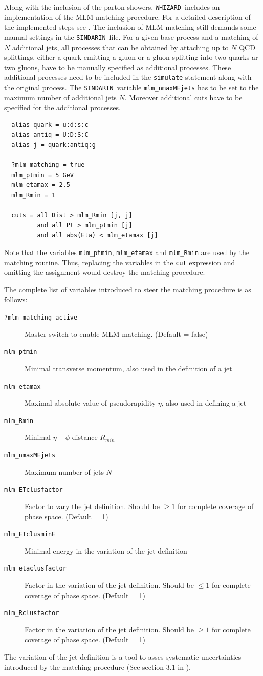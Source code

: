 \documentclass[12pt]{book}
\newcommand{\ttt}[1]{\texttt{#1}}
\newcommand{\whizard}{\ttt{WHIZARD}}
\newcommand{\sindarin}{\ttt{SINDARIN}}
\begin{document}
Along with the inclusion of the parton showers, \whizard\ includes an
implementation of the MLM matching procedure. For a detailed
description of the implemented steps see \cite{Kilian:2011ka}. The
inclusion of MLM matching still demands some manual settings in the
\sindarin\ file. For a given base process and a matching of $N$
additional jets, all processes that can be obtained by attaching up to
$N$ QCD splittings, either a quark emitting a gluon or a gluon
splitting into two quarks ar two gluons, have to be manually specified
as additional processes. These additional processes need to be
included in the \ttt{simulate} statement along with the original
process. The \sindarin\ variable \ttt{mlm\_nmaxMEjets} has to be
set to the maximum number of additional jets $N$. Moreover additional
cuts have to be specified for the additional processes.
\begin{verbatim}
  alias quark = u:d:s:c
  alias antiq = U:D:S:C
  alias j = quark:antiq:g

  ?mlm_matching = true
  mlm_ptmin = 5 GeV
  mlm_etamax = 2.5
  mlm_Rmin = 1

  cuts = all Dist > mlm_Rmin [j, j]
         and all Pt > mlm_ptmin [j]
         and all abs(Eta) < mlm_etamax [j]
\end{verbatim}
Note that the variables \ttt{mlm\_ptmin}, \ttt{mlm\_etamax} and
\ttt{mlm\_Rmin} are used by the matching routine. Thus, replacing the
variables in the \ttt{cut} expression and omitting the assignment
would destroy the matching procedure.

The complete list of variables introduced to steer the matching procedure is as follows:
\begin{description}
\item[\ttt{?mlm\_matching\_active}] Master switch to enable MLM
  matching. (Default = false)
\item[\ttt{mlm\_ptmin}] Minimal transverse momentum, also used in
  the definition of a jet
\item[\ttt{mlm\_etamax}] Maximal absolute value of pseudorapidity
  $\eta$, also used in defining a jet
\item[\ttt{mlm\_Rmin}] Minimal $\eta-\phi$ distance $R_{min}$
\item[\ttt{mlm\_nmaxMEjets}] Maximum number of jets $N$
\item[\ttt{mlm\_ETclusfactor}] Factor to vary the jet
  definition. Should be $\geq 1$ for complete coverage of phase
  space. (Default = 1)
\item[\ttt{mlm\_ETclusminE}] Minimal energy in the variation of the
  jet definition
\item[\ttt{mlm\_etaclusfactor}] Factor in the variation of the jet
  definition. Should be $\leq 1$ for complete coverage of phase
  space. (Default = 1)
\item[\ttt{mlm\_Rclusfactor}] Factor in the variation of the jet
  definition. Should be $\ge 1$ for complete coverage of phase
  space. (Default = 1)
\end{description}
The variation of the jet definition is a tool to asses systematic
uncertainties introduced by the matching procedure (See section 3.1 in
\cite{Kilian:2011ka}).
\end{document}
